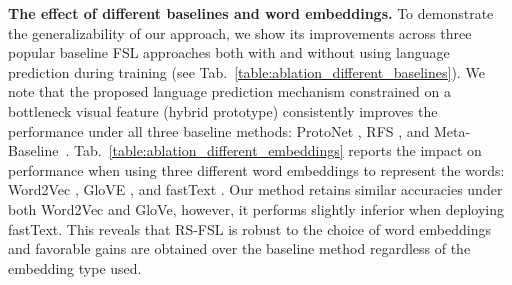 \documentclass{bmvc2k}
\begin{document}
\noindent \textbf{The effect of different baselines and word embeddings.} To demonstrate the generalizability of our approach, we show its improvements across three popular baseline FSL approaches both with and without using language prediction during training (see Tab.~\ref{table:ablation_different_baselines}). We note that the proposed language prediction mechanism constrained on a bottleneck visual feature (hybrid prototype) consistently improves the performance under all three baseline methods: ProtoNet \cite{snell2017prototypical}, RFS \cite{RFS}, and Meta-Baseline~\cite{chen2020new}. Tab.~\ref{table:ablation_different_embeddings} reports the impact on performance when using three different word embeddings to represent the words: Word2Vec \cite{word2vec} , GloVE \cite{pennington2014glove}, and fastText \cite{fasttext}. Our method retains similar accuracies under both Word2Vec and GloVe, however, it performs slightly inferior when deploying fastText. This reveals that RS-FSL is robust to the choice of word embeddings and favorable gains are obtained over the baseline method regardless of the embedding type used.
\end{document}
